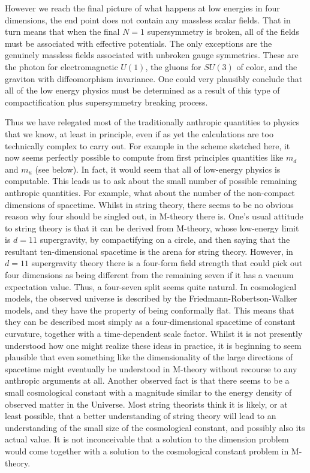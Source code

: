 \documentclass{article}
\begin{document}
However we reach the final picture of what happens at low energies in
four dimensions, the end point does not contain any massless scalar
fields. That in turn means that when the final $N=1$ supersymmetry is
broken, all of the fields must be associated with effective
potentials. The only exceptions are the genuinely massless fields
associated with unbroken gauge symmetries.  These are the photon for
electromagnetic $U(1)$, the gluons for $SU(3)$ of color, and the
graviton with diffeomorphism invariance.  One could very plausibly
conclude  that  all of the low energy physics must be determined as a
result of this type of compactification plus supersymmetry breaking process.

Thus we have relegated most of the traditionally anthropic quantities to
physics that we know, at least in principle, even if as yet the
calculations are too technically complex to carry out. For example in
the scheme sketched here, it now seems perfectly possible to compute
from first principles quantities like $m_d$ and $m_u$ (see below).  In
fact, it would seem that all of low-energy physics is computable. This
leads us to ask about the small number of possible 
remaining anthropic quantities. For example,
what about the number of the non-compact dimensions
of spacetime. Whilst in string theory, there seems to be no obvious
reason why four should be singled out, in M-theory there is. One's
usual attitude to string theory is that it can be derived from M-theory,
whose low-energy limit is $d=11$ supergravity, by compactifying on a
circle, and then saying that the resultant ten-dimensional spacetime is
the arena for string theory. However, in $d=11$ supergravity theory
there is a four-form field strength that could pick out four dimensions
as being different from the remaining seven if it has a vacuum expectation
value. Thus, a four-seven split seems quite natural. In cosmological
models, the observed universe is described by the
Friedmann-Robertson-Walker models, and they have the property of being
conformally flat. This means that they can be described most simply as a
four-dimensional spacetime of constant curvature, together with a
time-dependent scale factor. Whilst it is not presently understood how
one might realize these ideas in practice, it is beginning to seem
plausible that even something like the dimensionality of the large
directions of spacetime might eventually be understood in M-theory
without recourse to any anthropic arguments at all.  Another observed
fact is that there seems to be a small cosmological constant with a
magnitude similar to the energy density of observed matter in the
Universe. Most string theorists think it is likely, or at least
possible, that a better understanding of string theory will lead to an
understanding of the small size of the cosmological constant, and
possibly also its actual value. It is not inconceivable that a solution to
the dimension problem would come together with a solution to the
cosmological constant problem in M-theory.
\end{document}
